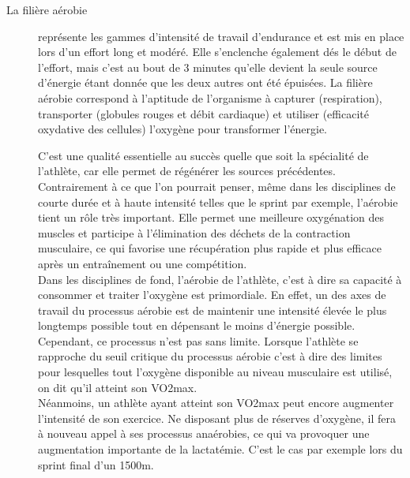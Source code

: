 \begin{description}
        
        \item [La filière aérobie]
         représente les gammes d’intensité de travail d’endurance et est mis en place lors d'un effort long et modéré.
        Elle s'enclenche également dés le début de l'effort, mais c'est au bout de 3 minutes qu'elle devient la seule source d'énergie étant donnée que les deux autres ont été épuisées.
        La filière aérobie correspond à l’aptitude de l’organisme à capturer (respiration), transporter (globules rouges et débit cardiaque) et utiliser (efficacité oxydative des cellules) l’oxygène pour transformer l’énergie.
         
        C'est une qualité essentielle au succès quelle que soit la spécialité de l'athlète, car elle permet de régénérer les sources précédentes.\\
         
        Contrairement à ce que l'on pourrait penser, même dans les disciplines de courte durée et à haute intensité telles que le sprint par exemple, l'aérobie tient un rôle très important. Elle permet une meilleure oxygénation des muscles et participe à l’élimination des déchets de la contraction musculaire, ce qui favorise une récupération plus rapide et plus efficace après un entraînement ou une compétition. \\
        
        Dans les disciplines de fond, l'aérobie de l'athlète, c'est à dire sa capacité à consommer et traiter l'oxygène est primordiale. En effet, un des axes de travail du processus aérobie est de maintenir une intensité élevée le plus longtemps possible tout en dépensant le moins d'énergie possible.\\
        
        Cependant, ce processus n'est pas sans limite. 
        Lorsque l’athlète se rapproche du seuil critique du processus aérobie c'est à dire des limites pour lesquelles tout l’oxygène disponible au niveau musculaire est utilisé, on dit qu'il atteint son VO2max. \\
        
        Néanmoins, un athlète ayant atteint son VO2max peut encore augmenter l’intensité de son exercice. Ne disposant plus de réserves d’oxygène, il fera à nouveau appel à ses processus anaérobies, ce qui va provoquer une augmentation importante de la lactatémie. C’est le cas par exemple lors du sprint final d’un 1500m.\\
        
        \end{description}
     
